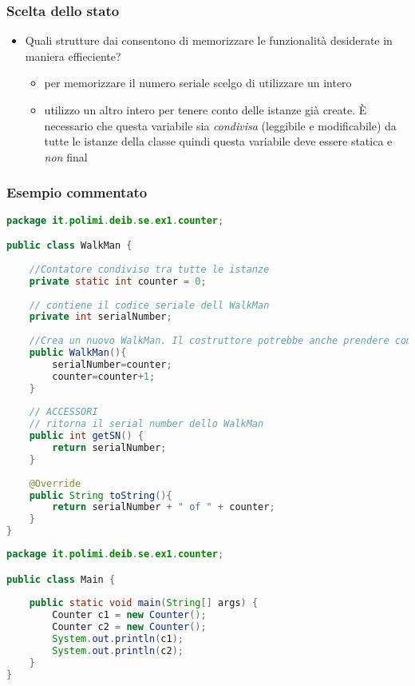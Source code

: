 \documentclass{article}
\begin{document}
\subsubsection{Scelta dello stato}
\begin{itemize}
\item Quali strutture dai consentono di memorizzare le funzionalit\`a desiderate in maniera effieciente?
\begin{itemize}
\item per memorizzare il numero seriale scelgo di utilizzare un intero
\item utilizzo un altro intero per tenere conto delle istanze gi\`a create. \`E necessario che questa variabile sia \emph{condivisa} (leggibile e modificabile) da tutte le istanze della classe quindi questa variabile deve essere statica e \emph{non} final
\end{itemize}
\end{itemize}



\subsubsection{Esempio commentato}
\begin{lstlisting}[language=Java,escapechar=|]
package it.polimi.deib.se.ex1.counter;

public class WalkMan {
	
	//Contatore condiviso tra tutte le istanze
	private static int counter = 0;
	
	// contiene il codice seriale dell WalkMan
	private int serialNumber;
	
	//Crea un nuovo WalkMan. Il costruttore potrebbe anche prendere come parametro un colore...
	public WalkMan(){
	    serialNumber=counter;
	    counter=counter+1;
	}
	
	// ACCESSORI
	// ritorna il serial number dello WalkMan
	public int getSN() {
		return serialNumber;
	}
	
	@Override
	public String toString(){
		return serialNumber + " of " + counter;
	}
}
\end{lstlisting}

\begin{lstlisting}[language=Java,escapechar=|]
package it.polimi.deib.se.ex1.counter;

public class Main {
	
	public static void main(String[] args) {
		Counter c1 = new Counter();
		Counter c2 = new Counter();
		System.out.println(c1);
		System.out.println(c2);
	}
}
\end{lstlisting}
\end{document}
